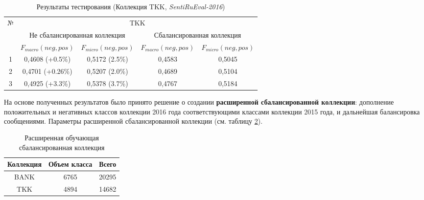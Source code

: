 \begin{table}[ht!]
\centering
\caption{Результаты тестирования (Коллекция TKK, {\it SentiRuEval-2016})}
\label{table:tkkResult2015}
\begin{tabular}{|c|c|c|c|c|}
\hline
\multirow{3}{*}{№} & \multicolumn{4}{c|}{TKK}                                                                             \\ \cline{2-5}
                   & \multicolumn{2}{c|}{Не сбалансированная коллекция} & \multicolumn{2}{c|}{Сбалансированная коллекция} \\ \cline{2-5}
                   & $F_{macro}(neg, pos)$    & $F_{micro}(neg, pos)$   & $F_{macro}(neg, pos)$  & $F_{micro}(neg, pos)$  \\ \hline
1                  & 0,4608 (+0.5\%)          & 0,5172 (2.5\%)          & 0,4583                 & 0,5045                 \\ \hline
2                  & 0,4701 (+0.26\%)         & 0,5207 (2.0\%)          & 0,4689                 & 0,5104                 \\ \hline
3                  & 0,4925 (+3.3\%)        & 0,5378 (3.7\%)          & 0,4767                 & 0,5184                 \\ \hline
\end{tabular}
\end{table}

%
%
На основе полученных результатов было принято решение о создании {\bf расширенной
сбалансированной коллекции}: дополнение положительных и негативных классов
коллекции 2016 года соответствующими классами коллекции 2015 года, и дальнейшая
балансировка сообщениями.
Параметры расширенной сбалансированной коллекции (см. таблицу
\ref{table:extendedCollection}).

\begin{table}[]
\centering
\caption{Расширенная обучающая сбалансированная коллекция}
\label{table:extendedCollection}
\begin{tabular}{|c|c|c|}
\hline
Коллекция & Объем класса & Всего \\ \hline
BANK      & 6765         & 20295 \\ \hline
TKK       & 4894         & 14682 \\ \hline
\end{tabular}
\end{table}
